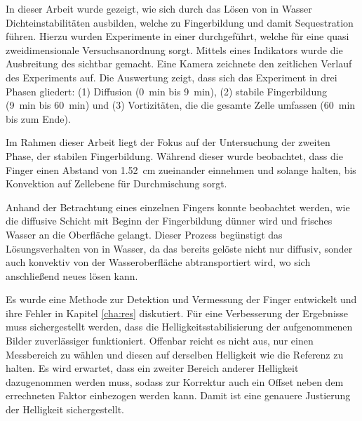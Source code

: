 
\label{cha:con}

In dieser Arbeit wurde gezeigt, wie sich durch das Lösen von \COT in Wasser Dichteinstabilitäten ausbilden, welche zu Fingerbildung und damit \COTm Sequestration führen. 
Hierzu wurden Experimente in einer \HSC durchgeführt, welche für eine quasi zweidimensionale Versuchsanordnung sorgt. Mittels eines Indikators wurde die Ausbreitung des \COT sichtbar gemacht. Eine Kamera zeichnete den zeitlichen Verlauf des Experiments auf.
Die Auswertung zeigt, dass sich das Experiment in drei Phasen gliedert: 
 (1) Diffusion (\SI{0}{\minute} bis \SI{9}{\minute}),
 (2) stabile Fingerbildung (\SI{9}{\minute} bis \SI{60}{\minute}) und
 (3) Vortizitäten, die die gesamte Zelle umfassen (\SI{60}{\minute} bis zum Ende). 

Im Rahmen dieser Arbeit liegt der Fokus auf der Untersuchung der zweiten Phase, der stabilen Fingerbildung. Während dieser wurde beobachtet, dass die Finger einen Abstand von \SI[round-precision=2]{1.52}{\centi\meter} zueinander einnehmen und solange halten, bis Konvektion auf Zellebene für Durchmischung sorgt.

Anhand der Betrachtung eines einzelnen Fingers konnte beobachtet werden, wie die diffusive Schicht mit Beginn der Fingerbildung dünner wird und frisches Wasser an die Oberfläche gelangt. Dieser Prozess begünstigt das Lösungsverhalten von \COT in Wasser, da das bereits gelöste \COT nicht nur diffusiv, sonder auch konvektiv von der Wasseroberfläche abtransportiert wird, wo sich anschließend neues \COT lösen kann. 

Es wurde eine Methode zur Detektion und Vermessung der Finger entwickelt und ihre Fehler in Kapitel \ref{cha:res} diskutiert. Für eine Verbesserung der Ergebnisse muss sichergestellt werden, dass die Helligkeitsstabilisierung der aufgenommenen Bilder zuverlässiger funktioniert. Offenbar reicht es nicht aus, nur einen Messbereich zu wählen und diesen auf derselben Helligkeit wie die Referenz zu halten. Es wird erwartet, dass ein zweiter Bereich anderer Helligkeit dazugenommen werden muss, sodass zur Korrektur auch ein Offset neben dem errechneten Faktor einbezogen werden kann. Damit ist eine genauere Justierung der Helligkeit sichergestellt.




